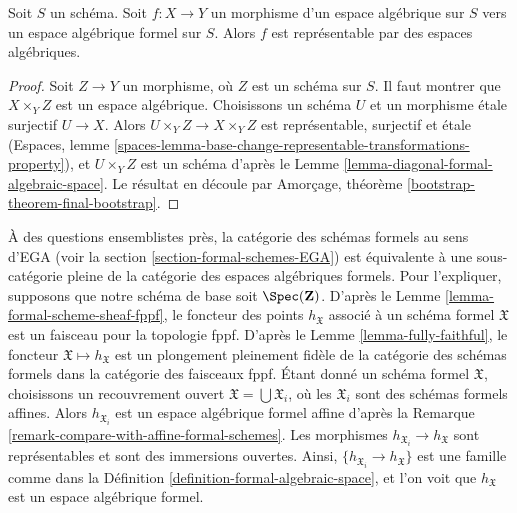 \begin{lemma}
\label{lemma-space-to-formal-space}
Soit $S$ un schéma. Soit $f : X \to Y$ un morphisme d'un
espace algébrique sur $S$ vers un espace algébrique formel sur $S$.
Alors $f$ est représentable par des espaces algébriques.
\end{lemma}

\begin{proof}
Soit $Z \to Y$ un morphisme, où $Z$ est un schéma sur $S$.
Il faut montrer que $X \times_Y Z$ est un espace algébrique.
Choisissons un schéma $U$ et un morphisme étale surjectif $U \to X$.
Alors $U \times_Y Z \to X \times_Y Z$ est représentable, surjectif et étale
(Espaces, lemme
\ref{spaces-lemma-base-change-representable-transformations-property}),
et $U \times_Y Z$ est un schéma d'après le
Lemme \ref{lemma-diagonal-formal-algebraic-space}.
Le résultat en découle par
Amorçage, théorème \ref{bootstrap-theorem-final-bootstrap}.
\end{proof}

\begin{remark}
\label{remark-compare-with-formal-schemes}
À des questions ensemblistes près, la catégorie des schémas formels au sens d'EGA
(voir la section \ref{section-formal-schemes-EGA}) est équivalente à une sous-catégorie
pleine de la catégorie des espaces algébriques formels. Pour l'expliquer,
supposons que notre schéma de base soit $\Spec(\mathbf{Z})$. D'après le
Lemme \ref{lemma-formal-scheme-sheaf-fppf}, le foncteur des points
$h_\mathfrak X$ associé à un schéma formel $\mathfrak X$ est un faisceau
pour la topologie fppf. D'après le Lemme \ref{lemma-fully-faithful},
le foncteur $\mathfrak X \mapsto h_\mathfrak X$ est un plongement pleinement fidèle
de la catégorie des schémas formels dans la catégorie des
faisceaux fppf. Étant donné un schéma formel $\mathfrak X$, choisissons un recouvrement ouvert
$\mathfrak X = \bigcup \mathfrak X_i$, où les $\mathfrak X_i$ sont des
schémas formels affines. Alors $h_{\mathfrak X_i}$
est un espace algébrique formel affine d'après la
Remarque \ref{remark-compare-with-affine-formal-schemes}.
Les morphismes $h_{\mathfrak X_i} \to h_\mathfrak X$ sont représentables
et sont des immersions ouvertes. Ainsi, $\{h_{\mathfrak X_i} \to h_\mathfrak X\}$
est une famille comme dans la Définition \ref{definition-formal-algebraic-space},
et l'on voit que $h_\mathfrak X$ est un espace algébrique formel.
\end{remark}

